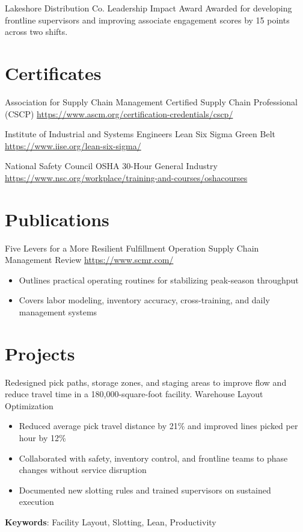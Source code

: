 \documentclass[a4paper, serif, 10pt]{moderncv}
\begin{document}
        {Lakeshore Distribution Co.}
        {Leadership Impact Award}
        {}
        {}
        {Awarded for developing frontline supervisors and improving associate engagement scores by 15 points across two shifts.}
\section{Certificates}

        {Association for Supply Chain Management}
        {Certified Supply Chain Professional (CSCP)}
        {\url{https://www.ascm.org/certification-credentials/cscp/}}
        {}
        {}

        {Institute of Industrial and Systems Engineers}
        {Lean Six Sigma Green Belt}
        {\url{https://www.iise.org/lean-six-sigma/}}
        {}
        {}

        {National Safety Council}
        {OSHA 30-Hour General Industry}
        {\url{https://www.nsc.org/workplace/training-and-courses/oshacourses}}
        {}
        {}
\section{Publications}

        {Five Levers for a More Resilient Fulfillment Operation}
        {Supply Chain Management Review}
        {\url{https://www.scmr.com/}}
        {}
        {\begin{itemize}
\item Outlines practical operating routines for stabilizing peak-season throughput
\item Covers labor modeling, inventory accuracy, cross-training, and daily management systems
\end{itemize}}
\section{Projects}

        {Redesigned pick paths, storage zones, and staging areas to improve flow and reduce travel time in a 180,000-square-foot facility.}
        {Warehouse Layout Optimization}
        {}
        {}
        {\begin{itemize}
\item Reduced average pick travel distance by 21\% and improved lines picked per hour by 12\%
\item Collaborated with safety, inventory control, and frontline teams to phase changes without service disruption
\item Documented new slotting rules and trained supervisors on sustained execution
\end{itemize}
\textbf{Keywords}: Facility Layout, Slotting, Lean, Productivity}
\end{document}
